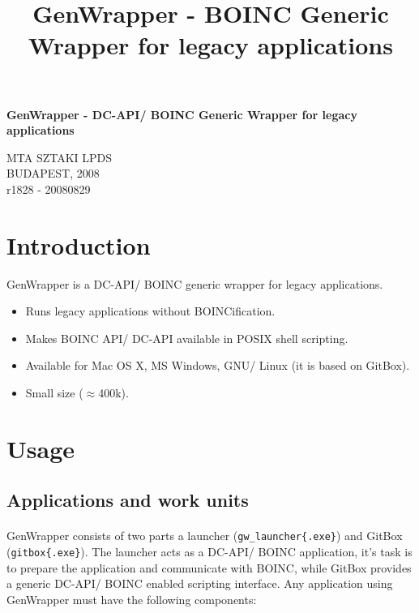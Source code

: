 \documentclass[a4paper,12pt,titlepage,dvipdfm]{article}
\title{GenWrapper - BOINC Generic Wrapper for legacy applications}
\begin{document}
\begin{center}
    \vspace*{20mm}
	\LARGE{\textbf{GenWrapper - DC-API/ BOINC Generic Wrapper for legacy applications}}
	\vfill
\end{center}
\begin{center}
    \vspace{30mm}
    \Large{MTA SZTAKI LPDS}\\
    \vspace{10mm}
    \large{BUDAPEST, 2008}\\
    \vspace{100mm}
    \small{r1828 - 20080829}
\end{center}
\thispagestyle{empty}

\pagebreak
\tableofcontents

\pagebreak
          

\section{Introduction}

GenWrapper is a DC-API/ BOINC generic wrapper for legacy applications.

\begin{itemize}
    \item Runs legacy applications without BOINCification.
    \item Makes BOINC API/ DC-API available in POSIX shell scripting.
    \item Available for Mac OS X, MS Windows, GNU/ Linux (it is based on GitBox).
    \item Small size (\(\approx\)400k).
\end{itemize}

\section{Usage}

\subsection{Applications and work units}

\paragraph*{} GenWrapper consists of two parts a launcher (\texttt{gw\_launcher\{.exe\}}) and GitBox (\texttt{gitbox\{.exe\}}). The launcher acts as a DC-API/ BOINC application, it's task is to prepare the application and communicate with BOINC, while GitBox provides a generic DC-API/ BOINC enabled scripting interface. Any application using GenWrapper must have the following components:
\end{document}
